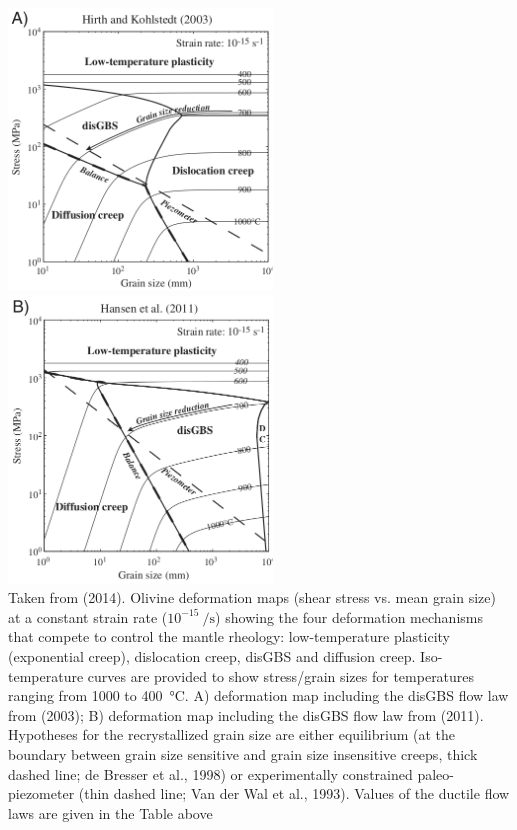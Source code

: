 \begin{center}
\includegraphics[width=7cm]{python_codes/fieldstone_121/images/gupr14a}
\includegraphics[width=7cm]{python_codes/fieldstone_121/images/gupr14b}\\
{\captionfont Taken from \textcite{gupr14} (2014). Olivine deformation maps 
(shear stress vs. mean grain size) at a constant strain rate ($10^{-15}~\si{\per\second}$) 
showing the four deformation mechanisms that compete to control the mantle rheology: 
low-temperature plasticity (exponential creep), dislocation creep, disGBS
and diffusion creep. Iso-temperature curves are provided to show stress/grain sizes for
temperatures ranging from 1000 to 400~\si{\celsius}. 
A) deformation map including the disGBS
flow law from \textcite{hiko03} (2003); 
B) deformation map including the disGBS flow law from \textcite{hazk11} (2011). 
Hypotheses for the recrystallized grain size are either
equilibrium (at the boundary between grain size sensitive and grain size insensitive
creeps, thick dashed line; de Bresser et al., 1998) or experimentally constrained paleo-
piezometer (thin dashed line; Van der Wal et al., 1993). Values of the ductile flow laws
are given in the Table above}
\end{center}


